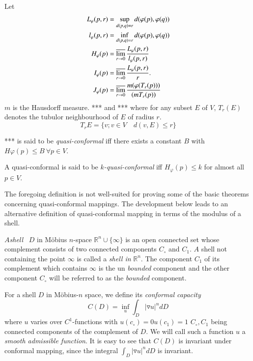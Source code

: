 Let
\begin{align*}
  L_\varphi (p, r) & = \sup\limits_{d (p, q)=r} d (\varphi (p),
  \varphi(q))\\
  l_\varphi (p, r) & = \inf\limits_{d (p, q)=r} d (\varphi (p),
  \varphi(q))\\
  H_\varphi(p) & = \varlimsup\limits_{r \to 0} \frac{L_\varphi(p,
    r)}{l_\varphi(p, r)}\\
  I_\varphi (p) & = \varlimsup\limits_{r \to 0} \frac{L_\varphi(p,
    r)}{r}.\\ 
J_\varphi (p) &= \varlimsup\limits_{r \to 0} \frac{m (\varphi
  (T_r(p)))}{(m T_r (p))}
\end{align*}
$m$ is the Hausdorff measure. *** and *** where for any subset $E$ of
$V$, $T_r(E)$ denotes the tubulor neighbourhood of $E$ of radius $r$.
$$
T_r E= \{ v; v \in V\quad d (v, E) \leq r\}
$$

\begin{defis*}
  *** is said to be \textit{quasi-conformal} iff there exists a
  constant $B$ with $H \varphi (p) \leq B ~\forall p \in V$.
\end{defis*}

A quasi-conformal is said to be \textit{$k$-quasi-conformal} iff
$H_\varphi (p) \leq k$ for almost all $p \in V$.

The foregoing definition is not well-suited for proving some of the
basic theorems concerning quasi-conformal mappings. The development
below leads to an alternative definition of quasi-conformal mapping in
terms of the modulus of a shell.

\begin{defis*}
  $A$\pageoriginale  \textit{shell} ~$D$ in M\"obius $n$-space $\mathbb{R}^n \cup \{
  \infty\}$ is an open connected set whose complement consists of two
  connected components $C_\circ$ and $C_1$. $A$ shell not containing
  the point $\infty$ is called a \textit{shell in} $\mathbb{R}^n$. The
  component $C_1$ of its complement which contains $\infty$ is the un
  \textit{bounded} component and the other component $C_\circ$ will be
  referred to as the \textit{bounded} component.
\end{defis*}

For a shell $D$ in M\"obius-$n$ space, we define its \textit{conformal
  capacity}
$$
C(D) = \inf\limits_{u} \int_D |\triangledown u|^n dD
$$
where $u$ varies over $C^1$-functions with $u(c_\circ)= 0 u(c_1)=1$ 
$C_\circ , C_1$ being connected components of the complement of $D$. We
will call such a function $u$ a \textit{smooth admissible
  function}. It is easy to see that $C(D)$ is invariant under
conformal mapping, since the integral $\int_D |\triangledown u|^n d D$
is invariant.


